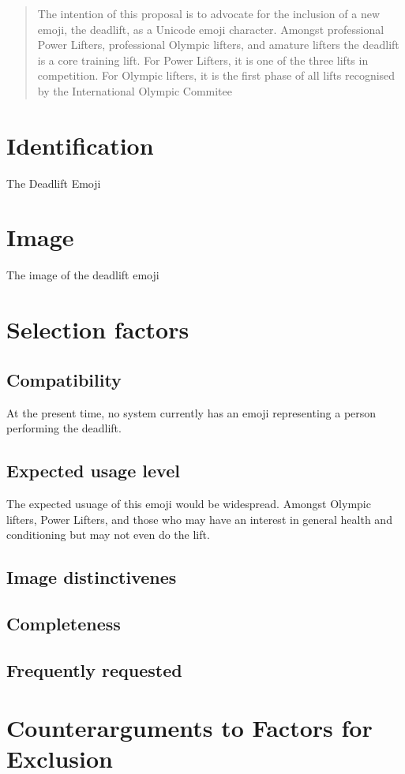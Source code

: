 \documentclass{article}
\begin{document}
\begin{abstract}
The intention of this proposal is to advocate for the inclusion of a new emoji, the deadlift, as a Unicode emoji character. 
Amongst professional Power Lifters, professional Olympic lifters, and amature lifters the deadlift is a core training lift. 
For Power Lifters, it is one of the three lifts in competition. For Olympic lifters, it is the first phase of all lifts recognised by the International Olympic Commitee
\end{abstract}
\section{Identification}
The Deadlift Emoji

\section{Image}
The image of the deadlift emoji

\section{Selection factors}
\subsection{Compatibility}
At the present time, no system currently has an emoji representing a person performing the deadlift. 

\subsection{Expected usage level}
The expected usuage of this emoji would be widespread. Amongst Olympic lifters, Power Lifters, and those who may have an interest in general health and conditioning but may not even do the
lift.

\subsection{Image distinctivenes}
\subsection{Completeness}
\subsection{Frequently requested}

\section{Counterarguments to Factors for Exclusion}
\end{document}
